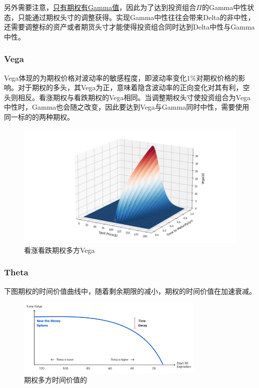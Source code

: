 \documentclass[11pt]{article}
\begin{document}
另外需要注意，\uline{只有期权有Gamma值}，因此为了达到投资组合$\Pi$的Gamma中性状态，只能通过期权头寸的调整获得。实现Gamma中性往往会带来Delta的非中性，还需要调整标的资产或者期货头寸才能使得投资组合同时达到Delta中性与Gamma中性。

\subsubsection{Vega}

Vega体现的为期权价格对波动率的敏感程度，即波动率变化$1\%$对期权价格的影响。对于期权的多头，其Vega为正，意味着隐含波动率的正向变化对其有利，空头则相反。看涨期权与看跌期权的Vega相同。当调整期权头寸使投资组合为Vega中性时，Gamma也会随之改变，因此要达到Vega与Gamma同时中性，需要使用同一标的的两种期权。
\begin{figure}[H]
    \centering
    \includegraphics[width=\textwidth]{fig/vega_surf.png}
    \caption{看涨看跌期权多方Vega}
    \label{fig:vega_surf}
\end{figure}

\subsubsection{Theta}

下图期权的时间价值曲线中，随着剩余期限的减小，期权的时间价值在加速衰减。
\begin{figure}[H]
    \centering
    \includegraphics[width=0.8\textwidth]{fig/time_value.jpeg}
    \caption{期权多方时间价值的}
    \label{fig:time_value}
\end{figure}
\end{document}
